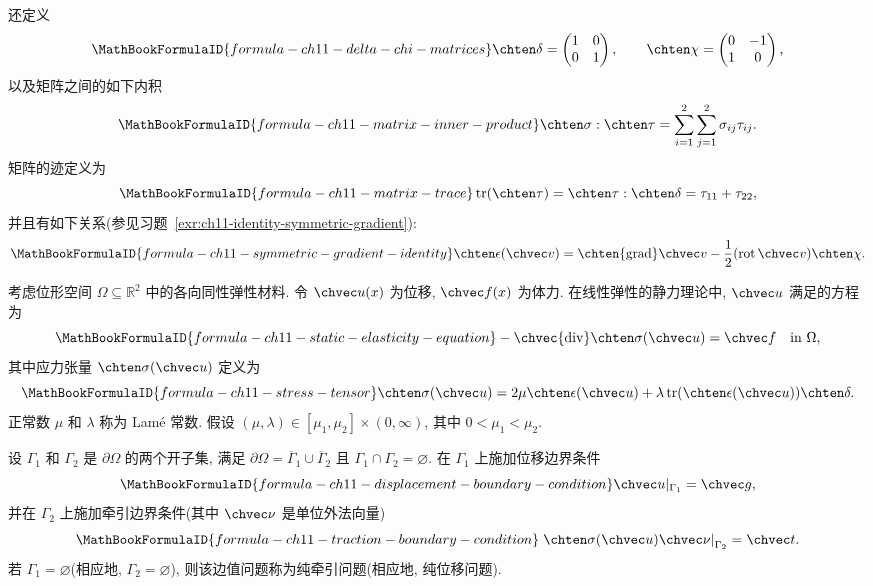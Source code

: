 还定义
\[
\MathBookFormulaID{formula-ch11-delta-chi-matrices}
\chten\delta=\begin{pmatrix}1&0\\0&1\end{pmatrix},
\qquad
\chten\chi=\begin{pmatrix}0&-1\\1&0\end{pmatrix},
\]
以及矩阵之间的如下内积
\[
\MathBookFormulaID{formula-ch11-matrix-inner-product}
\chten\sigma:\chten\tau=\sum_{i=1}^2\sum_{j=1}^2\sigma_{ij}\tau_{ij}.
\]
矩阵的迹定义为
\[
\MathBookFormulaID{formula-ch11-matrix-trace}
\operatorname{tr}(\chten\tau)=\chten\tau:\chten\delta=\tau_{11}+\tau_{22},
\]
并且有如下关系(参见习题~\ref{exr:ch11-identity-symmetric-gradient}):
\begin{equation}
\MathBookFormulaID{formula-ch11-symmetric-gradient-identity}
\label{eq:ch11-symmetric-gradient-identity}
\chten\epsilon(\chvec v)=\chten{\operatorname{grad}}\chvec v-
\frac12(\operatorname{rot}\chvec v)\chten\chi.
\end{equation}

考虑位形空间 $\Omega\subseteq\mathbb R^2$ 中的各向同性弹性材料. 令 $\chvec u(x)$ 为位移, $\chvec f(x)$ 为体力. 在线性弹性的静力理论中, $\chvec u$ 满足的方程为
\begin{equation}
\MathBookFormulaID{formula-ch11-static-elasticity-equation}
\label{eq:ch11-static-elasticity-equation}
-\chvec{\operatorname{div}}\chten\sigma(\chvec u)=\chvec f
\quad\text{in }\Omega,
\end{equation}
其中应力张量 $\chten\sigma(\chvec u)$ 定义为
\begin{equation}
\MathBookFormulaID{formula-ch11-stress-tensor}
\label{eq:ch11-stress-tensor}
\chten\sigma(\chvec u)=2\mu\chten\epsilon(\chvec u)
+\lambda\operatorname{tr}(\chten\epsilon(\chvec u))\chten\delta.
\end{equation}
正常数 $\mu$ 和 $\lambda$ 称为 Lamé 常数. 假设
$ (\mu,\lambda)\in[\mu_1,\mu_2]\times(0,\infty)$, 其中 $0<\mu_1<\mu_2$.

设 $\Gamma_1$ 和 $\Gamma_2$ 是 $\partial\Omega$ 的两个开子集, 满足
$\partial\Omega=\overline{\Gamma}_1\cup\overline{\Gamma}_2$ 且
$\Gamma_1\cap\Gamma_2=\varnothing$. 在 $\Gamma_1$ 上施加位移边界条件
\begin{equation}
\MathBookFormulaID{formula-ch11-displacement-boundary-condition}
\label{eq:ch11-displacement-boundary-condition}
\chvec u|_{\Gamma_1}=\chvec g,
\end{equation}
并在 $\Gamma_2$ 上施加牵引边界条件(其中 $\chvec\nu$ 是单位外法向量)
\begin{equation}
\MathBookFormulaID{formula-ch11-traction-boundary-condition}
\label{eq:ch11-traction-boundary-condition}
\left.\chten\sigma(\chvec u)\chvec\nu\right|_{\Gamma_2}=\chvec t.
\end{equation}
若 $\Gamma_1=\varnothing$(相应地, $\Gamma_2=\varnothing$), 则该边值问题称为纯牵引问题(相应地, 纯位移问题).

